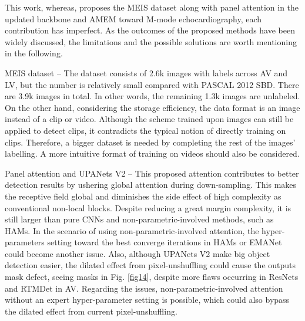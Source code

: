 \documentclass{article}
\begin{document}
This work, whereas, proposes the MEIS dataset along with panel attention in the updated backbone and AMEM toward M-mode echocardiography, each contribution has imperfect. As the outcomes of the proposed methods have been widely discussed, the limitations and the possible solutions are worth mentioning in the following.

MEIS dataset – The dataset consists of 2.6k images with labels across AV and LV, but the number is relatively small compared with PASCAL 2012 SBD. There are 3.9k images in total. In other words, the remaining 1.3k images are unlabeled. On the other hand, considering the storage efficiency, the data format is an image instead of a clip or video. Although the scheme trained upon images can still be applied to detect clips, it contradicts the typical notion of directly training on clips. Therefore, a bigger dataset is needed by completing the rest of the images' labelling. A more intuitive format of training on videos should also be considered.

Panel attention and UPANets V2 – This proposed attention contributes to better detection results by ushering global attention during down-sampling. This makes the receptive field global and diminishes the side effect of high complexity as conventional non-local blocks. Despite reducing a great margin complexity, it is still larger than pure CNNs and non-parametric-involved methods, such as HAMs. In the scenario of using non-parametric-involved attention, the hyper-parameters setting toward the best converge iterations in HAMs or EMANet could become another issue. Also, although UPANets V2 make big object detection easier, the dilated effect from pixel-unshuffling could cause the outputs mask defect, seeing masks in Fig. \ref{fig14}, despite more flaws occurring in ResNets and RTMDet in AV. Regarding the issues, non-parametric-involved attention without an expert hyper-parameter setting is possible, which could also bypass the dilated effect from current pixel-unshuffling.  
\end{document}
